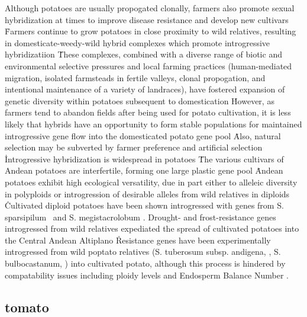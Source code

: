 \documentclass[11pt]{article}
\begin{document}
Although potatoes are usually propogated clonally, farmers also promote sexual hybridization at times to improve disease resistance and develop new cultivars \cite{quiros1992increase}\.
Farmers continue to grow potatoes in close proximity to wild relatives, resulting in domesticate-weedy-wild hybrid complexes which promote introgressive hybridizatiion \cite{rabinowitz1990high, johns1987relationships, linder1987diversity}\.
These complexes, combined with a diverse range of biotic and environmental selective pressures and local farming practices (human-mediated migration, isolated farmsteads in fertile valleys, clonal propogation, and intentional maintenance of a variety of landraces), have fostered expansion of genetic diversity within potatoes subsequent to domestication \cite{brush1995potato}\.
However, as farmers tend to abandon fields after being used for potato cultivation, it is less likely that hybrids have an opportunity to form stable populations for maintained introgressive gene flow into the domesticated potato gene pool \cite{brush1995potato}\.
Also, natural selection may be subverted by farmer preference and artificial selection \cite{brush1981dynamics}\.

Introgressive hybridization is widespread in potatoes \cite{grun1990evolution}\.
The various cultivars of Andean potatoes are interfertile, forming one large plastic gene pool \cite{quiros1992increase}\.
Andean potatoes exhibit high ecological versatility, due in part either to alleleic diversity in polyploids or introgression of desirable alleles from wild relatives in diploids \cite{zimmerer1998ecogeography}\.
Cultivated diploid potatoes have been shown introgressed with genes from S. sparsipilum \cite{rabinowitz1990high}\ and S. megistacrolobum \cite{johns1987relationships, huaman1980solanum}.
Drought- and frost-resistance genes introgressed from wild relatives expediated the spread of cultivated potatoes into the Central Andean Altiplano \cite{johns1986ongoing, hawkes1962origin, schmiediche1980breeding}\.
Resistance genes have been experimentally introgressed from wild poptato relatives (S. tuberosum subsp. andigena, \cite{van1999tight}, S. bulbocastanum, \cite{van2003ancient}) into cultivated potato, although this process is hindered by compatability issues including ploidy levels and Endosperm Balance Number \cite{johnston1980significance}.

\subsection*{tomato}
\end{document}
